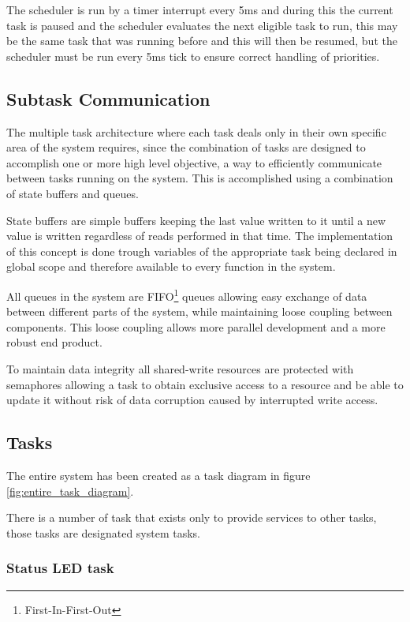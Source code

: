 \documentclass[../../../main]{subfiles}
\begin{document}
The scheduler is run by a timer interrupt every 5ms and during this the current task is paused and the scheduler evaluates the next eligible task to run, this may be the same task that was running before and this will then be resumed, but the scheduler must be run every 5ms tick to ensure correct handling of priorities.

\subsection{Subtask Communication}

The multiple task architecture where each task deals only in their own specific area of the system requires, since the combination of tasks are designed to accomplish one or more high level objective, a way to efficiently communicate between tasks running on the system. 
This is accomplished using a combination of state buffers and queues. 

State buffers are simple buffers keeping the last value written to it until a new value is written regardless of reads performed in that time. The implementation of this concept is done trough variables of the appropriate task being declared in global scope and therefore available to every function in the system.

All queues in the system are FIFO\footnote{First-In-First-Out} queues allowing easy exchange of data between different parts of the system, while maintaining loose coupling between components. This loose coupling allows more parallel development and a more robust end product. 

To maintain data integrity all shared-write resources are protected with semaphores allowing a task to obtain exclusive access to a resource and be able to update it without risk of data corruption caused by interrupted write access.




\subsection{Tasks}

The entire system has been created as a task diagram in figure \ref{fig:entire_task_diagram}. 

There is a number of task that exists only to provide services to other tasks, those tasks are designated system tasks. 

\subsubsection{Status LED task}
\end{document}

